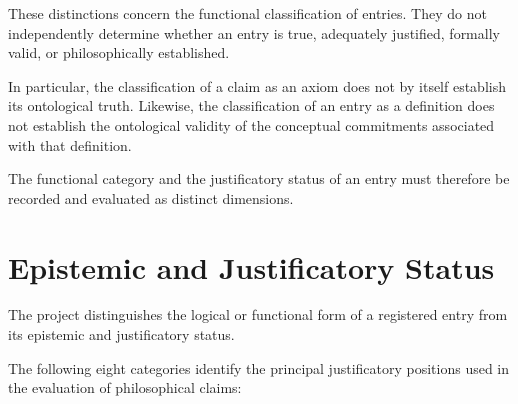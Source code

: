These distinctions concern the functional classification
of entries. They do not independently determine whether
an entry is true, adequately justified, formally valid,
or philosophically established.

In particular, the classification of a claim as an axiom
does not by itself establish its ontological truth.
Likewise, the classification of an entry as a definition
does not establish the ontological validity of the
conceptual commitments associated with that definition.

The functional category and the justificatory status
of an entry must therefore be recorded and evaluated
as distinct dimensions.



\section*{Epistemic and Justificatory Status}

The project distinguishes the logical or functional form
of a registered entry from its epistemic and justificatory
status.

The following eight categories identify the principal
justificatory positions used in the evaluation of
philosophical claims:

